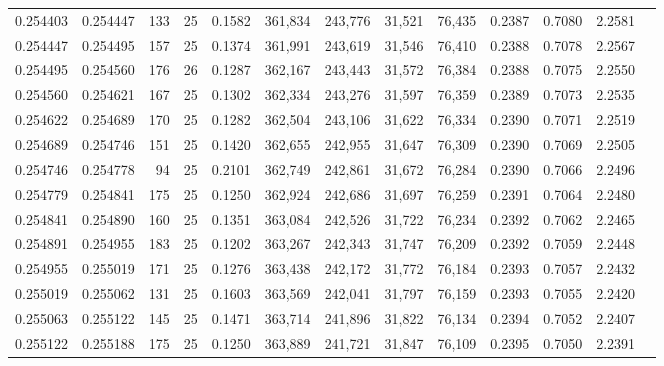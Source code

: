 \begin{tabular}{rrrrrrrrrrrrr}
0.254403 & 0.254447 &   133 &  25 &                                     0.1582 & 361,834 & 243,776 &  31,521 &  76,435 & 0.2387 & 0.7080 & 2.2581 \\
0.254447 & 0.254495 &   157 &  25 &                                     0.1374 & 361,991 & 243,619 &  31,546 &  76,410 & 0.2388 & 0.7078 & 2.2567 \\
0.254495 & 0.254560 &   176 &  26 &                                     0.1287 & 362,167 & 243,443 &  31,572 &  76,384 & 0.2388 & 0.7075 & 2.2550 \\
0.254560 & 0.254621 &   167 &  25 &                                     0.1302 & 362,334 & 243,276 &  31,597 &  76,359 & 0.2389 & 0.7073 & 2.2535 \\
0.254622 & 0.254689 &   170 &  25 &                                     0.1282 & 362,504 & 243,106 &  31,622 &  76,334 & 0.2390 & 0.7071 & 2.2519 \\
0.254689 & 0.254746 &   151 &  25 &                                     0.1420 & 362,655 & 242,955 &  31,647 &  76,309 & 0.2390 & 0.7069 & 2.2505 \\
0.254746 & 0.254778 &    94 &  25 &                                     0.2101 & 362,749 & 242,861 &  31,672 &  76,284 & 0.2390 & 0.7066 & 2.2496 \\
0.254779 & 0.254841 &   175 &  25 &                                     0.1250 & 362,924 & 242,686 &  31,697 &  76,259 & 0.2391 & 0.7064 & 2.2480 \\
0.254841 & 0.254890 &   160 &  25 &                                     0.1351 & 363,084 & 242,526 &  31,722 &  76,234 & 0.2392 & 0.7062 & 2.2465 \\
0.254891 & 0.254955 &   183 &  25 &                                     0.1202 & 363,267 & 242,343 &  31,747 &  76,209 & 0.2392 & 0.7059 & 2.2448 \\
0.254955 & 0.255019 &   171 &  25 &                                     0.1276 & 363,438 & 242,172 &  31,772 &  76,184 & 0.2393 & 0.7057 & 2.2432 \\
0.255019 & 0.255062 &   131 &  25 &                                     0.1603 & 363,569 & 242,041 &  31,797 &  76,159 & 0.2393 & 0.7055 & 2.2420 \\
0.255063 & 0.255122 &   145 &  25 &                                     0.1471 & 363,714 & 241,896 &  31,822 &  76,134 & 0.2394 & 0.7052 & 2.2407 \\
0.255122 & 0.255188 &   175 &  25 &                                     0.1250 & 363,889 & 241,721 &  31,847 &  76,109 & 0.2395 & 0.7050 & 2.2391 \\

\end{tabular}
